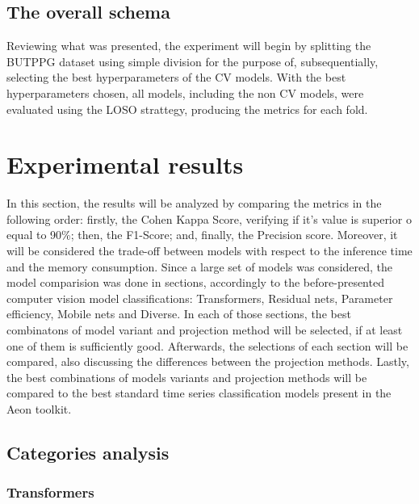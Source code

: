 \subsection{The overall schema}

Reviewing what was presented, the experiment will begin by splitting the \acrshort{BUTPPG} dataset using simple division for the purpose of, subsequentially, selecting the best hyperparameters of the \acrshort{CV} models. With the best hyperparameters chosen, all models, including the non \acrshort{CV} models, were evaluated using the \acrshort{LOSO} strattegy, producing the metrics for each fold.


\section{Experimental results}


In this section, the results will be analyzed by comparing the metrics in the following order: firstly, the Cohen Kappa Score, verifying if it's value is superior o equal to 90\%; then, the F1-Score; and, finally, the Precision score. Moreover, it will be considered the trade-off between models with respect to the inference time and the memory consumption. Since a large set of models was considered, the model comparision was done in sections, accordingly to the before-presented computer vision model classifications: Transformers, Residual nets, Parameter efficiency, Mobile nets and Diverse. In each of those sections, the best combinatons of model variant and projection method will be selected, if at least one of them is sufficiently good. Afterwards, the selections of each section will be compared, also discussing the differences between the projection methods. Lastly, the best combinations of models variants and projection methods will be compared to the best standard time series classification models present in the Aeon toolkit.

\pagebreak

\subsection{Categories analysis}

\subsubsection{Transformers}

